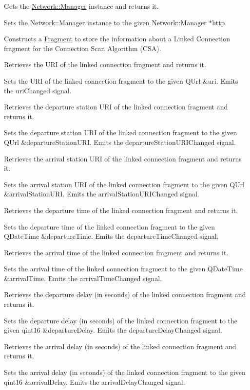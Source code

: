 Gets the \mbox{\hyperlink{classNetwork_1_1Manager}{Network\+::\+Manager}} instance and returns it.

Sets the \mbox{\hyperlink{classNetwork_1_1Manager}{Network\+::\+Manager}} instance to the given \mbox{\hyperlink{classNetwork_1_1Manager}{Network\+::\+Manager}} $\ast$http.

Constructs a \mbox{\hyperlink{classFragments_1_1Fragment}{Fragment}} to store the information about a Linked Connection fragment for the Connection Scan Algorithm (C\+SA).

Retrieves the U\+RI of the linked connection fragment and returns it.

Sets the U\+RI of the linked connection fragment to the given Q\+Url \&uri. Emits the uri\+Changed signal.

Retrieves the departure station U\+RI of the linked connection fragment and returns it.

Sets the departure station U\+RI of the linked connection fragment to the given Q\+Url \&departure\+Station\+U\+RI. Emits the departure\+Station\+U\+R\+I\+Changed signal.

Retrieves the arrival station U\+RI of the linked connection fragment and returns it.

Sets the arrival station U\+RI of the linked connection fragment to the given Q\+Url \&arrival\+Station\+U\+RI. Emits the arrival\+Station\+U\+R\+I\+Changed signal.

Retrieves the departure time of the linked connection fragment and returns it.

Sets the departure time of the linked connection fragment to the given Q\+Date\+Time \&departure\+Time. Emits the departure\+Time\+Changed signal.

Retrieves the arrival time of the linked connection fragment and returns it.

Sets the arrival time of the linked connection fragment to the given Q\+Date\+Time \&arrival\+Time. Emits the arrival\+Time\+Changed signal.

Retrieves the departure delay (in seconds) of the linked connection fragment and returns it.

Sets the departure delay (in seconds) of the linked connection fragment to the given qint16 \&departure\+Delay. Emits the departure\+Delay\+Changed signal.

Retrieves the arrival delay (in seconds) of the linked connection fragment and returns it.

Sets the arrival delay (in seconds) of the linked connection fragment to the given qint16 \&arrival\+Delay. Emits the arrival\+Delay\+Changed signal.

